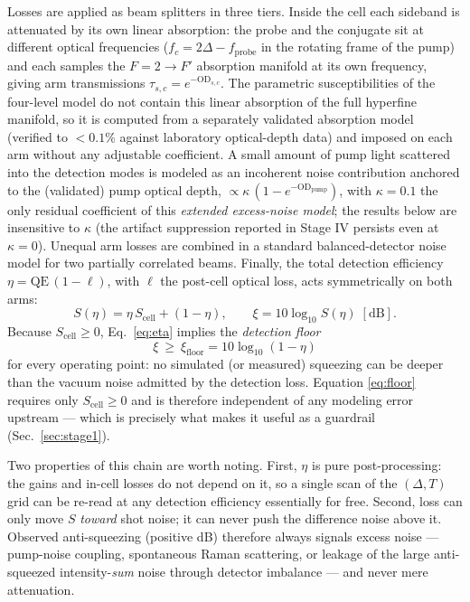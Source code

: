 \documentclass[11pt,a4paper]{article}
\begin{document}
Losses are applied as beam splitters in three tiers. Inside the cell each
sideband is attenuated by its own linear absorption: the probe and the
conjugate sit at different optical frequencies
($f_c = 2\Delta - f_{\mathrm{probe}}$ in the rotating frame of the pump) and
each samples the $F{=}2\to F'$ absorption manifold at its own frequency,
giving arm transmissions $\tau_{s,c}=e^{-\mathrm{OD}_{s,c}}$. The
parametric susceptibilities of the four-level model do not contain this
linear absorption of the full hyperfine manifold, so it is computed from a
separately validated absorption model (verified to $<0.1\%$ against
laboratory optical-depth data) and imposed on each arm without any adjustable
coefficient. A small amount of pump light scattered into the detection modes
is modeled as an incoherent noise contribution anchored to the (validated)
pump optical depth, $\propto\kappa\,(1-e^{-\mathrm{OD}_{\mathrm{pump}}})$,
with $\kappa=0.1$ the only residual coefficient of this \emph{extended
excess-noise model}; the results below are insensitive to $\kappa$ (the
artifact suppression reported in Stage IV persists even at $\kappa=0$).
Unequal arm losses are combined in a standard balanced-detector noise model
for two partially correlated beams. Finally, the total detection efficiency
$\eta=\mathrm{QE}\,(1-\ell)$, with $\ell$ the post-cell optical loss, acts
symmetrically on both arms:
\begin{equation}
S(\eta)=\eta\,S_{\mathrm{cell}}+(1-\eta),
\qquad
\xi=10\log_{10}S(\eta)\;[\mathrm{dB}].
\label{eq:eta}
\end{equation}
Because $S_{\mathrm{cell}}\ge 0$, Eq.~\eqref{eq:eta} implies the
\emph{detection floor}
\begin{equation}
\boxed{\;\xi \ \ge\ \xi_{\mathrm{floor}}=10\log_{10}(1-\eta)\;}
\label{eq:floor}
\end{equation}
for every operating point: no simulated (or measured) squeezing can be
deeper than the vacuum noise admitted by the detection loss. Equation
\eqref{eq:floor} requires only $S_{\mathrm{cell}}\ge 0$ and is therefore
independent of any modeling error upstream --- which is precisely what makes
it useful as a guardrail (Sec.~\ref{sec:stage1}).

Two properties of this chain are worth noting. First, $\eta$ is pure
post-processing: the gains and in-cell losses do not depend on it, so a
single scan of the $(\Delta,T)$ grid can be re-read at any detection
efficiency essentially for free. Second, loss can only move $S$ \emph{toward}
shot noise; it can never push the difference noise above it. Observed
anti-squeezing (positive dB) therefore always signals excess noise ---
pump-noise coupling, spontaneous Raman scattering, or leakage of the large
anti-squeezed intensity-\emph{sum} noise through detector imbalance --- and
never mere attenuation.
\end{document}
